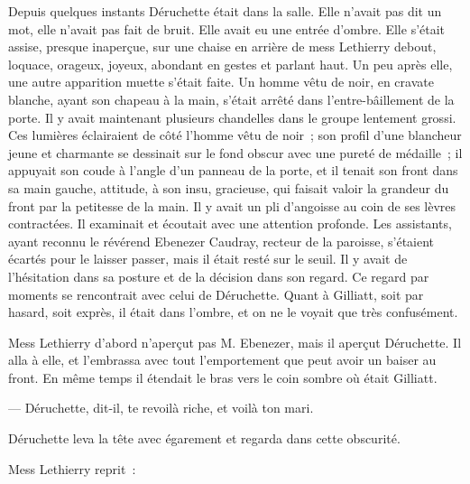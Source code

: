 \documentclass[french,twoside]{book} %
\begin{document}
Depuis quelques instants Déruchette était dans la  salle. Elle n’avait pas dit un mot, elle n’avait pas fait de bruit. Elle avait eu une entrée d’ombre. Elle s’était assise, presque inaperçue, sur une chaise en arrière de mess Lethierry debout, loquace, orageux, joyeux, abondant en gestes et parlant haut. Un peu après elle, une autre apparition muette s’était faite. Un homme vêtu de noir, en cravate blanche, ayant son chapeau à la main, s’était arrêté dans l’entre-bâillement de la porte. Il y avait maintenant plusieurs chandelles dans le groupe lentement grossi. Ces lumières éclairaient de côté l’homme vêtu de noir ; son profil d’une blancheur jeune et charmante se dessinait sur le fond obscur avec une pureté de médaille ; il appuyait son coude à l’angle d’un panneau de la porte, et il tenait son front dans sa main gauche, attitude, à son insu, gracieuse, qui faisait valoir la grandeur du front par la petitesse de la main. Il y avait un pli d’angoisse au coin de ses lèvres contractées. Il examinait et écoutait avec une attention profonde. Les assistants, ayant reconnu le révérend Ebenezer Caudray, recteur de la paroisse, s’étaient écartés pour le laisser passer, mais il était resté sur le seuil. Il y avait de l’hésitation dans sa posture et de la décision dans son regard. Ce regard par moments se rencontrait avec celui de Déruchette. Quant à Gilliatt, soit par hasard, soit exprès, il était dans l’ombre, et on ne le voyait que très confusément.\par
Mess Lethierry d’abord n’aperçut pas M. Ebenezer, mais il aperçut Déruchette. Il alla à elle, et l’embrassa avec tout l’emportement que peut avoir un baiser au  front. En même temps il étendait le bras vers le coin sombre où était Gilliatt.\par
— Déruchette, dit-il, te revoilà riche, et voilà ton mari.\par
Déruchette leva la tête avec égarement et regarda dans cette obscurité.\par
Mess Lethierry reprit :\par
\end{document}

